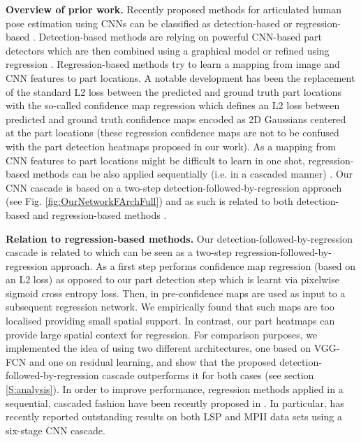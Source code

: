 \documentclass[runningheads]{llncs}
\begin{document}
\textbf{Overview of prior work.} Recently proposed methods for articulated human pose estimation using CNNs can be classified as detection-based \cite{chen2014articulated, tompson2014joint, tompson2015efficient, pishchulin2015deepcut, insafutdinov2016deepercut} or regression-based \cite{toshev2014deeppose, pfister2014deep, pfister2015flowing, belagiannis2015robust, carreira2015human, wei2016convolutional}. Detection-based methods are relying on powerful CNN-based part detectors which are then combined using a graphical model \cite{chen2014articulated, tompson2014joint} or refined using regression \cite{tompson2015efficient, pishchulin2015deepcut}. Regression-based methods try to learn a mapping from image and CNN features to part locations. A notable development has been the replacement of the standard L2 loss between the predicted and ground truth part locations with the so-called confidence map regression which defines an L2 loss between predicted and ground truth confidence maps encoded as 2D Gaussians centered at the part locations \cite{tompson2014joint, pfister2015flowing} (these regression confidence maps are not to be confused with the part detection heatmaps proposed in our work). As a mapping from CNN features to part locations might be difficult to learn in one shot, regression-based methods can be also applied sequentially (i.e. in a cascaded manner) \cite{toshev2014deeppose, carreira2015human, wei2016convolutional}. Our CNN cascade is based on a two-step detection-followed-by-regression approach (see Fig. \ref{fig:OurNetworkFArchFull}) and as such is related to both detection-based \cite{tompson2015efficient, pishchulin2015deepcut} and regression-based methods \cite{pfister2015flowing, carreira2015human, wei2016convolutional}.  

\textbf{Relation to regression-based methods.} Our detection-followed-by-regression cascade is related to \cite{pfister2015flowing} which can be seen as a two-step regression-followed-by-regression approach. As a first step \cite{pfister2015flowing} performs confidence map regression (based on an L2 loss) as opposed to our part detection step which is learnt via pixelwise sigmoid cross entropy loss. Then, in \cite{pfister2015flowing} pre-confidence maps are used as input to a subsequent regression network. We empirically found that such maps are too localised providing small spatial support. In contrast, our part heatmaps can provide large spatial context for regression. For comparison purposes, we implemented the idea of \cite{pfister2015flowing} using two different architectures, one based on VGG-FCN and one on residual learning, and show that the proposed detection-followed-by-regression cascade outperforms it for both cases (see section \ref{S:analysis}). In order to improve performance, regression methods applied in a sequential, cascaded fashion have been recently proposed in \cite{carreira2015human, wei2016convolutional}. In particular, \cite{wei2016convolutional} has recently reported outstanding results on both LSP \cite{johnson2010clustered} and MPII \cite{andriluka20142d} data sets using a six-stage CNN cascade.
\end{document}
